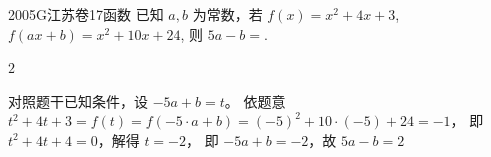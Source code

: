 
\begin{problem}{2005}{G}{江苏卷}{17}{函数}
已知 $a,b$ 为常数，若 $f(x)=x^2+4x+3$, $f(ax+b)=x^2+10x+24$, 则 $5a-b=$\underline{\hspace{4em}}.
\end{problem}

\begin{answer}
$2$
\end{answer}

\begin{solutions}
对照题干已知条件，设 $-5a+b=t$。  
依题意 $t^2+4t+3=f(t)=f(-5\cdot a+b)=(-5)^2+10\cdot(-5)+24=-1$，  
即 $t^2+4t+4=0$，解得 $t=-2$，  
即 $-5a+b=-2$，故 $5a-b=2$  
\end{solutions}